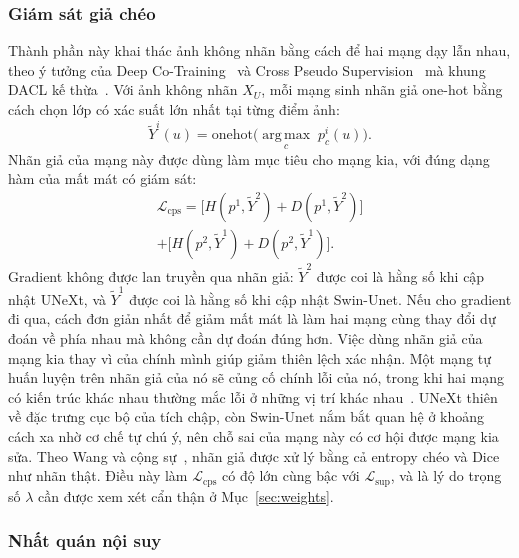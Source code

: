 \documentclass{IEEEtran}
\newcommand{\Lx}[1]{\mathcal{L}_{\mathrm{#1}}}
\begin{document}
\subsubsection{Giám sát giả chéo}

Thành phần này khai thác ảnh không nhãn bằng cách để hai mạng dạy lẫn nhau, theo ý tưởng của Deep Co-Training~\cite{dct} và Cross Pseudo Supervision~\cite{cps} mà khung DACL kế thừa~\cite{dacl}. Với ảnh không nhãn $X_U$, mỗi mạng sinh nhãn giả one-hot bằng cách chọn lớp có xác suất lớn nhất tại từng điểm ảnh:
\begin{equation}
  \tilde{Y}^{i}(u) = \mathrm{onehot}\Big(\operatorname*{arg\,max}_{c}\; p^{i}_{c}(u)\Big). \label{eq:pseudo}
\end{equation}
Nhãn giả của mạng này được dùng làm mục tiêu cho mạng kia, với đúng dạng hàm của mất mát có giám sát:
\begin{multline}
  \Lx{cps} = \big[H(p^1,\tilde{Y}^2)+D(p^1,\tilde{Y}^2)\big] \\
  + \big[H(p^2,\tilde{Y}^1)+D(p^2,\tilde{Y}^1)\big]. \label{eq:cps}
\end{multline}
Gradient không được lan truyền qua nhãn giả: $\tilde{Y}^2$ được coi là hằng số khi cập nhật UNeXt, và $\tilde{Y}^1$ được coi là hằng số khi cập nhật Swin-Unet. Nếu cho gradient đi qua, cách đơn giản nhất để giảm mất mát là làm hai mạng cùng thay đổi dự đoán về phía nhau mà không cần dự đoán đúng hơn. Việc dùng nhãn giả của mạng kia thay vì của chính mình giúp giảm thiên lệch xác nhận. Một mạng tự huấn luyện trên nhãn giả của nó sẽ củng cố chính lỗi của nó, trong khi hai mạng có kiến trúc khác nhau thường mắc lỗi ở những vị trí khác nhau~\cite{ctct}. UNeXt thiên về đặc trưng cục bộ của tích chập, còn Swin-Unet nắm bắt quan hệ ở khoảng cách xa nhờ cơ chế tự chú ý, nên chỗ sai của mạng này có cơ hội được mạng kia sửa. Theo Wang và cộng sự~\cite{dacl}, nhãn giả được xử lý bằng cả entropy chéo và Dice như nhãn thật. Điều này làm $\Lx{cps}$ có độ lớn cùng bậc với $\Lx{sup}$, và là lý do trọng số $\lambda$ cần được xem xét cẩn thận ở Mục~\ref{sec:weights}.

\subsubsection{Nhất quán nội suy}
\end{document}
